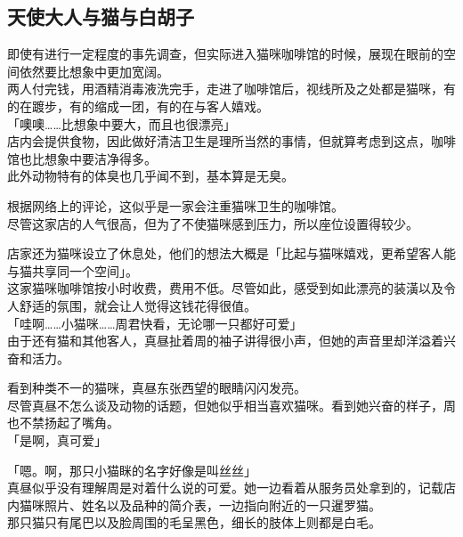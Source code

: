 \subsection{天使大人与猫与白胡子}

即使有进行一定程度的事先调查，但实际进入猫咪咖啡馆的时候，展现在眼前的空间依然要比想象中更加宽阔。\\

两人付完钱，用酒精消毒液洗完手，走进了咖啡馆后，视线所及之处都是猫咪，有的在踱步，有的缩成一团，有的在与客人嬉戏。\\

「噢噢……比想象中要大，而且也很漂亮」\\

店内会提供食物，因此做好清洁卫生是理所当然的事情，但就算考虑到这点，咖啡馆也比想象中要洁净得多。\\

此外动物特有的体臭也几乎闻不到，基本算是无臭。

根据网络上的评论，这似乎是一家会注重猫咪卫生的咖啡馆。\\

尽管这家店的人气很高，但为了不使猫咪感到压力，所以座位设置得较少。

店家还为猫咪设立了休息处，他们的想法大概是「比起与猫咪嬉戏，更希望客人能与猫共享同一个空间」。\\

这家猫咪咖啡馆按小时收费，费用不低。尽管如此，感受到如此漂亮的装潢以及令人舒适的氛围，就会让人觉得这钱花得很值。\\

「哇啊……小猫咪……周君快看，无论哪一只都好可爱」\\

由于还有猫和其他客人，真昼扯着周的袖子讲得很小声，但她的声音里却洋溢着兴奋和活力。

看到种类不一的猫咪，真昼东张西望的眼睛闪闪发亮。\\

尽管真昼不怎么谈及动物的话题，但她似乎相当喜欢猫咪。看到她兴奋的样子，周也不禁扬起了嘴角。\\

「是啊，真可爱」

「嗯。啊，那只小猫眯的名字好像是叫丝丝」\\

真昼似乎没有理解周是对着什么说的可爱。她一边看着从服务员处拿到的，记载店内猫咪照片、姓名以及品种的简介表，一边指向附近的一只暹罗猫。\\

那只猫只有尾巴以及脸周围的毛呈黑色，细长的肢体上则都是白毛。

